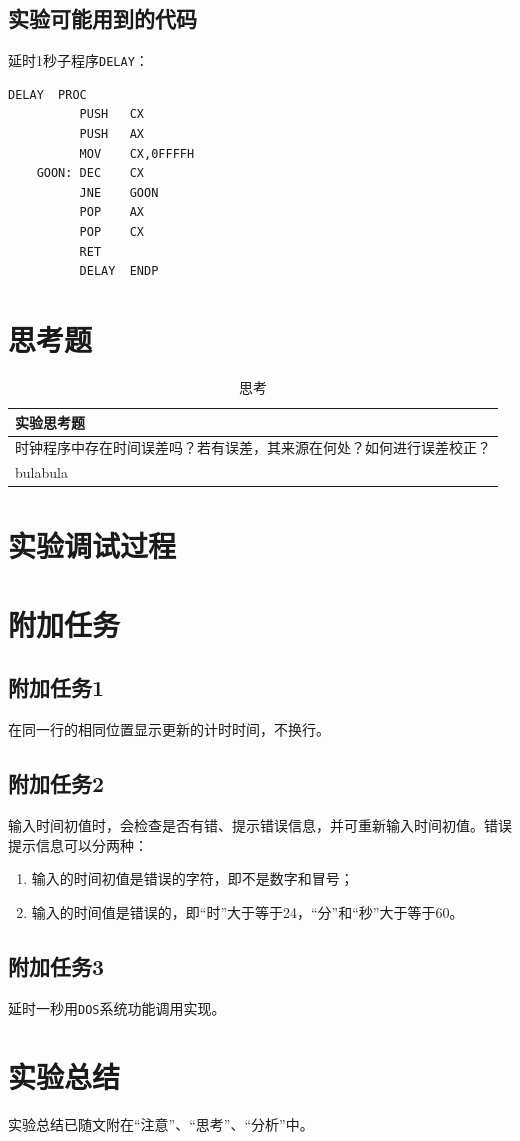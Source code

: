 \documentclass[11pt]{SEU-Digital-Report}
\newcommand{\grayrow}{\rowcolor[rgb]{ .906, .902, .902}}
\begin{document}
\subsection{实验可能用到的代码}
延时1秒子程序\texttt{DELAY}：
\begin{lstlisting}[language={[x86masm]Assembler},title=delay]
          DELAY  PROC
          PUSH   CX
          PUSH   AX
          MOV    CX,0FFFFH
    GOON: DEC    CX
          JNE    GOON
          POP    AX
          POP    CX
          RET
          DELAY  ENDP
\end{lstlisting}

\section{思考题}
\begin{table}[htbp]
    \centering
    \caption{思考 \label{tab:parameters}}
    \bgroup{}
    \setlength{\tabcolsep}{4.5mm}
        \begin{tabular}{l}
          \toprule
          \textbf{实验思考题} \\
          \midrule\midrule
          \grayrow 时钟程序中存在时间误差吗？若有误差，其来源在何处？如何进行误差校正？\\
           bulabula   \\
          \bottomrule
        \end{tabular}
    \egroup
\end{table}

\section{实验调试过程}


\section{附加任务}
\subsection{附加任务1}
在同一行的相同位置显示更新的计时时间，不换行。

\subsection{附加任务2}
输入时间初值时，会检查是否有错、提示错误信息，并可重新输入时间初值。错误提示信息可以分两种：
\begin{enumerate}
    \item 输入的时间初值是错误的字符，即不是数字和冒号；
    \item 输入的时间值是错误的，即“时”大于等于24，“分”和“秒”大于等于60。
\end{enumerate}



\subsection{附加任务3}
延时一秒用\texttt{DOS}系统功能调用实现。

\section{实验总结}
实验总结已随文附在“注意”、“思考”、“分析”中。

\printbibliography
\end{document}
